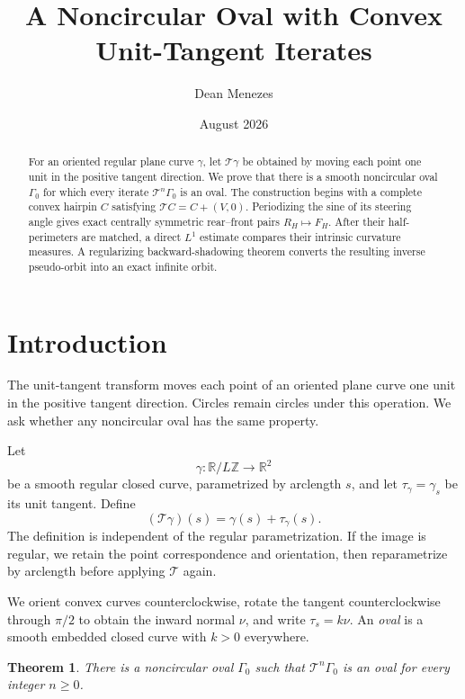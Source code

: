 \documentclass[11pt]{article}
\title{A Noncircular Oval with Convex Unit-Tangent Iterates}
\author{Dean Menezes}
\date{August 2026}
\newtheorem{theorem}{Theorem}[section]
\theoremstyle{remark}
\newcommand{\R}{\mathbb R}
\newcommand{\Tmap}{\mathcal T}
\begin{document}
\maketitle

\begin{abstract}
For an oriented regular plane curve \(\gamma\), let \(\Tmap\gamma\) be
obtained by moving each point one unit in the positive tangent direction.  We
prove that there is a smooth noncircular oval \(\Gamma_0\) for which every
iterate \(\Tmap^n\Gamma_0\) is an oval.  The construction begins with a
complete convex hairpin \(C\) satisfying \(\Tmap C=C+(V,0)\).  Periodizing
the sine of its steering angle gives exact centrally symmetric rear--front
pairs \(R_H\mapsto F_H\).  After their half-perimeters are matched, a direct
\(L^1\) estimate compares their intrinsic curvature measures.  A regularizing
backward-shadowing theorem converts the resulting inverse pseudo-orbit into an
exact infinite orbit.
\end{abstract}

\section{Introduction}

The unit-tangent transform moves each point of an oriented plane curve one
unit in the positive tangent direction.  Circles remain circles under this
operation.  We ask whether any noncircular oval has the same property.

Let
\[
  \gamma:\R/L\mathbb Z\longrightarrow\R^2
\]
be a smooth regular closed curve, parametrized by arclength \(s\), and let
\(\tau_\gamma=\gamma_s\) be its unit tangent.  Define
\begin{equation}\label{eq:Tdef}
  (\Tmap\gamma)(s)=\gamma(s)+\tau_\gamma(s).
\end{equation}
The definition is independent of the regular parametrization.  If the image
is regular, we retain the point correspondence and orientation, then
reparametrize by arclength before applying \(\Tmap\) again.

We orient convex curves counterclockwise, rotate the tangent counterclockwise
through \(\pi/2\) to obtain the inward normal \(\nu\), and write
\(\tau_s=k\nu\).  An \emph{oval} is a smooth embedded closed curve with
\(k>0\) everywhere.

\begin{theorem}\label{thm:main}
There is a noncircular oval \(\Gamma_0\) such that \(\Tmap^n\Gamma_0\) is an
oval for every integer \(n\geq0\).
\end{theorem}
\end{document}
